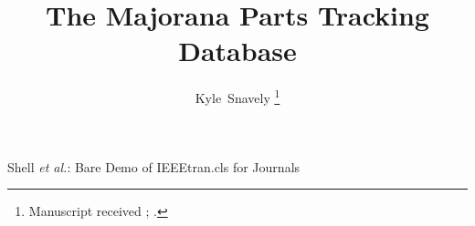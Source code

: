 \documentclass[journal]{IEEEtran}
\begin{document}
%
\title{The Majorana Parts Tracking Database}
%
%
%

\author{Kyle~Snavely
\thanks{Manuscript received ; .}}

% 
%



%
{Shell \MakeLowercase{\textit{et al.}}: Bare Demo of IEEEtran.cls for Journals}
% 




\end{document}
